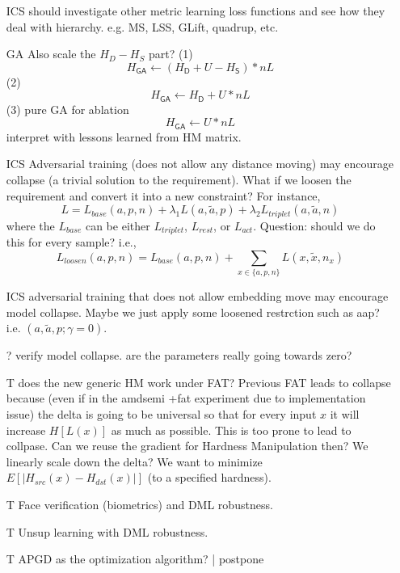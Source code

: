 \begin{itemize}
	\item [ICS] should investigate other metric learning loss functions and see
		how they deal with hierarchy. e.g. MS, LSS, GLift, quadrup, etc.

	\item [GA] Also scale the $H_D-H_S$ part?
		(1) $$ H_\mathsf{GA} \leftarrow (H_\mathsf{D} + U - H_\mathsf{S}) * nL $$
		(2) $$ H_\mathsf{GA} \leftarrow H_\mathsf{D} + U * nL $$
		(3) pure GA for ablation $$ H_\mathsf{GA} \leftarrow U * nL $$
		interpret with lessons learned from HM matrix.

	\item [ICS] Adversarial training (does not allow any distance moving) may
		encourage collapse (a trivial solution to the requirement). What if we
		loosen the requirement and convert it into a new constraint? For
		instance, \[
			L=L_{base}(a,p,n)+\lambda_{1}L(a,\tilde{a},p)+\lambda_{2}L_{triplet}(a,\tilde{a},n)
		\] where the $L_{base}$ can be either $L_{triplet}$, $L_{rest}$, or
		$L_{act}$. Question: should we do this for every sample? i.e., \[
			L_{loosen}(a,p,n)=L_{base}(a,p,n)+\sum_{x\in\{a,p,n\}}L(x,\tilde{x},n_{x})
		\]

	\item [ICS] adversarial training that does not allow embedding move may
		encourage model collapse. Maybe we just apply some loosened restrction
		such as aap? i.e. $(a,\tilde{a},p;\gamma=0)$.

	\item [?] verify model collapse. are the parameters really going towards zero?

	\item [T] does the new generic HM work under FAT?
		Previous FAT leads to collapse because (even if in the amdsemi +fat
		experiment due to implementation issue) the delta is going to be universal
		so that for every input $x$ it will increase $H[L(x)]$ as much as possible.
		This is too prone to lead to collpase. Can we reuse the gradient for 
		Hardness Manipulation then? We linearly scale down the delta?
		We want to minimize $E[|H_{src}(x)-H_{dst}(x)|]$ (to a specified hardness).

	\item [T] Face verification (biometrics) and DML robustness.

	\item [T] Unsup learning with DML robustness.

	\item [T] APGD as the optimization algorithm? | postpone


\end{itemize}
